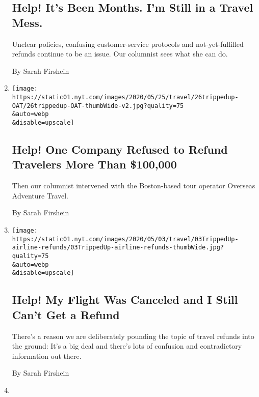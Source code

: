 \begin{enumerate}
  \hypertarget{help-its-been-months-im-still-in-a-travel-mess}{%
  \subsection{Help! It's Been Months. I'm Still in a Travel
  Mess.}\label{help-its-been-months-im-still-in-a-travel-mess}}

  Unclear policies, confusing customer-service protocols and
  not-yet-fulfilled refunds continue to be an issue. Our columnist sees
  what she can do.

  By Sarah Firshein
\item
  \href{/2020/05/25/travel/coronavirus-refunds-overseas-adventure-travel.html}{}

  \texttt{[image: https://static01.nyt.com/images/2020/05/25/travel/26trippedup-OAT/26trippedup-OAT-thumbWide-v2.jpg?quality=75\\\&auto=webp\\\&disable=upscale]}

  \hypertarget{help-one-company-refused-to-refund-travelers-more-than-100000}{%
  \subsection{Help! One Company Refused to Refund Travelers More Than
  \$100,000}\label{help-one-company-refused-to-refund-travelers-more-than-100000}}

  Then our columnist intervened with the Boston-based tour operator
  Overseas Adventure Travel.

  By Sarah Firshein
\item
  \href{/2020/05/01/travel/trip-refund-airlines.html}{}

  \texttt{[image: https://static01.nyt.com/images/2020/05/03/travel/03TrippedUp-airline-refunds/03TrippedUp-airline-refunds-thumbWide.jpg?quality=75\\\&auto=webp\\\&disable=upscale]}

  \hypertarget{help-my-flight-was-canceled-and-i-still-cant-get-a-refund}{%
  \subsection{Help! My Flight Was Canceled and I Still Can't Get a
  Refund}\label{help-my-flight-was-canceled-and-i-still-cant-get-a-refund}}

  There's a reason we are deliberately pounding the topic of travel
  refunds into the ground: It's a big deal and there's lots of confusion
  and contradictory information out there.

  By Sarah Firshein
\item
  \href{/2020/04/11/travel/coronavirus-travel-trip-refunds.html}{}


\end{enumerate}
